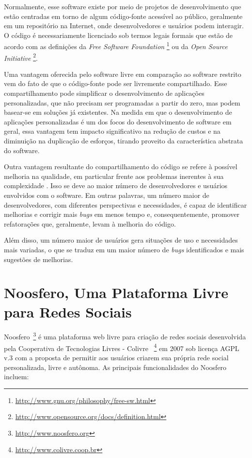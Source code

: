 Normalmente, esse software existe por meio de projetos de desenvolvimento
que estão centradas em torno de algum código-fonte acessível ao público,
geralmente em um repositório na Internet, onde desenvolvedores e usuários
podem interagir.
%
O código é necessariamente licenciado sob termos legais formais que estão de
acordo com as definições da \textit{Free Software Foundation}
\footnote{\url{http://www.gnu.org/philosophy/free-sw.html}} ou da
\textit{Open Source Initiative}
\footnote{\url{http://www.opensource.org/docs/definition.html}}.


Uma vantagem oferecida pelo software livre em comparação ao software
restrito vem do fato de que o código-fonte pode ser livremente compartilhado.
%
Esse compartilhamento pode simplificar o desenvolvimento de aplicações
personalizadas, que não precisam ser programadas a partir do zero, mas
podem basear-se em soluções já existentes.
%
Na medida em que o desenvolvimento de aplicações personalizadas é um dos focos do
desenvolvimento de software em geral, essa vantagem tem impacto significativo na
redução de custos e na diminuição na duplicação de esforços, tirando proveito da
característica abstrata do software.

Outra vantagem resultante do compartilhamento do código se refere
à possível melhoria na qualidade, em particular frente aos
problemas inerentes à sua complexidade \cite{CatedralBazzar}.
%
Isso se deve ao maior número de desenvolvedores e usuários envolvidos
com o software. Em outras palavras, um número maior de desenvolvedores, com diferentes
perspectivas e necessidades, é capaz de identificar melhorias e corrigir
mais \emph{bugs} em menos tempo e, consequentemente, promover refatorações que,
geralmente, levam à melhoria do código.

%
Além disso, um número maior de usuários gera situações de uso e
necessidades mais variadas, o que se traduz em um maior número
de \emph{bugs} identificados e mais sugestões de melhorias.


\section{Noosfero, Uma Plataforma Livre para Redes Sociais}
\label{noosfero-section}

Noosfero~\footnote{\url{http://www.noosfero.org}}
é uma  plataforma web livre para criação de redes sociais desenvolvida
pela Cooperativa de Tecnologias Livres - Colivre
~\footnote{\url{http://www.colivre.coop.br}} 
em 2007 sob licença AGPL v.3 com a proposta de permitir aos usuários criarem sua
própria rede social personalizada, livre e autônoma.
%
As principais funcionalidades do Noosfero incluem:

